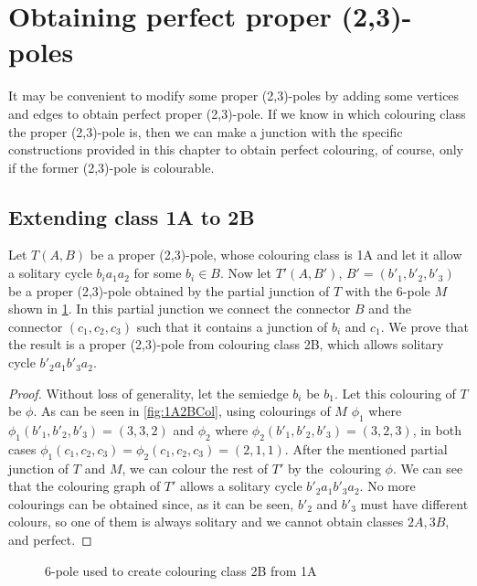 \section{Obtaining perfect proper (2,3)-poles}\label{sec:classes-to-perfect}

It may be convenient to modify some proper (2,3)-poles by adding some vertices and edges to obtain perfect proper (2,3)-pole. If we know in which colouring class the proper (2,3)-pole is, then we can make a junction with the specific constructions provided in this chapter to obtain perfect colouring, of course, only if the former (2,3)-pole is colourable. 

\subsection{Extending class 1A to 2B}

Let $T(A,B)$ be a proper (2,3)-pole, whose colouring class is 1A and let it allow a solitary cycle $b_ia_1a_2$ for some $b_i\in B$. Now let $T'(A,B')$, $B'=(b'_1, b'_2, b'_3)$ be a proper (2,3)-pole obtained by the partial junction of $T$ with the 6-pole $M$ shown in \cref{fig:1A2B}. In this partial junction we connect the connector $B$ and the connector $(c_1,c_2,c_3)$ such that it contains a junction of $b_i$ and $c_1$. We prove that the result is a proper (2,3)-pole from colouring class 2B, which allows solitary cycle $b'_2a_1b'_3a_2$.

\begin{proof}
	Without loss of generality, let the semiedge $b_i$ be $b_1$. Let this colouring of $T$ be $\phi$. As can be seen in \cref{fig:1A2BCol}, using colourings of $M$ $\phi_1$ where $\phi_1(b'_1,b'_2,b'_3)=(3,3,2)$ and $\phi_2$ where $\phi_2(b'_1,b'_2,b'_3)=(3,2,3)$, in both cases $\phi_1(c_1,c_2,c_3)=\phi_2(c_1,c_2,c_3)=(2,1,1)$. After the mentioned partial junction of $T$ and $M$, we can colour the rest of $T'$ by the~colouring $\phi$. We can see that the colouring graph of $T'$ allows a solitary cycle $b'_2a_1b'_3a_2$. No more colourings can be obtained since, as it can be seen, $b'_2$ and $b'_3$ must have different colours, so one of them is always solitary and we cannot obtain classes $2A,3B$, and perfect.
\end{proof}

\begin{figure}[h]
	\centering
	
	\caption{6-pole used to create colouring class 2B from 1A}
	\label{fig:1A2B}
\end{figure}

